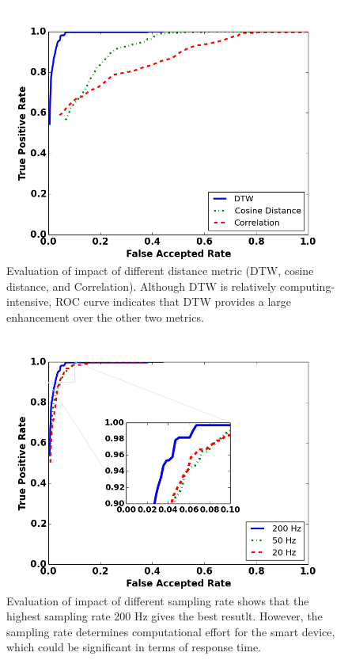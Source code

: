 \begin{figure}
\includegraphics[width=\columnwidth]{figure/roc_dtw_cos_cor.png}
\caption{\label{fig:roc_dtw_cos_cor} Evaluation of impact of different distance metric (DTW, cosine distance, and Correlation). Although DTW is relatively computing-intensive, ROC curve indicates  that DTW provides a large enhancement over the other two metrics. }
\end{figure}

\begin{figure}
\includegraphics[width=\columnwidth]{figure/roc_dtw_diff_freq.png}
\caption{\label{fig:roc_dtw_diff_freq} Evaluation of impact of different sampling rate shows that the highest sampling rate 200 Hz gives the best resutlt. However, the sampling rate determines computational effort for the smart device, which could be significant in terms of response time.}
\end{figure}


